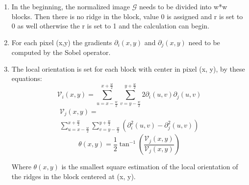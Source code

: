 \begin{enumerate}
	\item In the beginning, the normalized image $\mathcal{G}$ needs to be divided into w*w blocks. Then there is no ridge in the block, value 0 is assigned and r is set to 0 as well otherwise the r is set to 1 and the calculation can begin. \cite{ori} \cite{orientation_field_2}
	
	\item For each pixel (x,y) the gradients  $\partial_{i}(x, y)$ and $\partial_{j}(x, y)$ need to be computed by the Sobel operator.\cite{ori}
	
	  \item The local orientation is set for each block with center in pixel (x, y), by these equations: \cite{ori} \cite{orientation_field_2}
        \begin{equation} 
            \mathcal{V}_{i}(x, y)=\sum_{u=x-\frac{w}{2}}^{x+\frac{w}{2}} \sum_{v=y-\frac{w}{2}}^{y+\frac{w}{2}} 2 \partial_{i}(u, v) \partial_{j}(u, v)
        \end{equation}
        \begin{equation} 
            \begin{split}
                \mathcal{V}_{j}(x, y)=\\\sum_{u=x-\frac{w}{2}}^{x+\frac{w}{2}} \sum_{v=y-\frac{w}{2}}^{y+\frac{w}{2}}\left(\partial_{i}^{2}(u, v)-\partial_{j}^{2}(u, v)\right)
            \end{split}
        \end{equation}
        \begin{equation} 
            \theta(x, y)=\frac{1}{2} \tan ^{-1}\left(\frac{\mathcal{V}_{j}(x, y)}{\mathcal{V}_{j}(x, y)}\right)
        \end{equation}
        
        Where $\theta(x, y)$ is the smallest square estimation of the local orientation of the ridges in the block centered at (x, y). \cite{orientation_field_2}
         

\end{enumerate}
